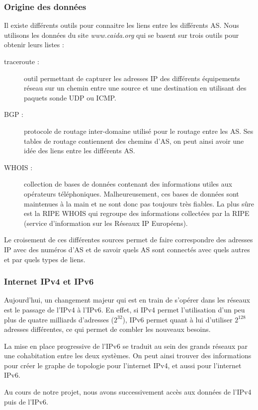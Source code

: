 \subsubsection{Origine des donn\'ees}
\par
Il existe diff\'erents outils pour connaitre les liens entre les diff\'erents AS. Nous utilisons les donn\'ees du site \textit{www.caida.org} qui se basent sur trois outils pour obtenir leurs listes :
\begin{description}
 \item[traceroute : ] outil permettant de capturer les adresses IP des diff\'erents \'equipements r\'eseau sur un chemin entre une source et une destination en utilisant des paquets sonde UDP ou ICMP.
 \item[BGP : ] protocole de routage inter-domaine utilis\'e pour le routage entre les AS. Ses tables de routage contiennent des chemins d'AS, on peut ainsi avoir une idée des liens entre les diff\'erents AS.
 \item[WHOIS : ] collection de bases de donn\'ees contenant des informations utiles aux op\'erateurs t\'el\'ephoniques. Malheureusement, ces bases de donn\'ees sont maintenues \`a la main et ne  sont donc pas toujours tr\`es fiables. La plus sûre est la RIPE WHOIS qui regroupe des informations collect\'ees par la RIPE (service d'information sur les R\'eseaux IP Europ\'eens).
\end{description}
\par
Le croisement de ces diff\'erentes sources permet de faire correspondre des adresses IP avec des num\'eros d'AS et de savoir quels AS sont connect\'es avec quels autres et par quels types de liens.

\subsubsection{Internet IPv4 et IPv6}
\par
Aujourd'hui, un changement majeur qui est en train de s'op\'erer dans les r\'eseaux est le passage de l'IPv4 \`a l'IPv6. En effet, si IPv4 permet l'utilisation d'un peu plus de quatre milliards d'adresses ($2^{32}$), IPv6 permet quant \`a lui d'utiliser $2^{128}$ adresses diff\'erentes, ce qui permet de combler les nouveaux besoins.
\par
La mise en place progressive de l'IPv6 se traduit au sein des grands r\'eseaux par une cohabitation entre les deux syst\`emes. On peut ainsi trouver des informations pour cr\'eer le graphe de topologie pour l'internet IPv4, et aussi pour l'internet IPv6.
\par
Au cours de notre projet, nous avons successivement acc\`es aux donn\'ees de l'IPv4 puis de l'IPv6.
% 
